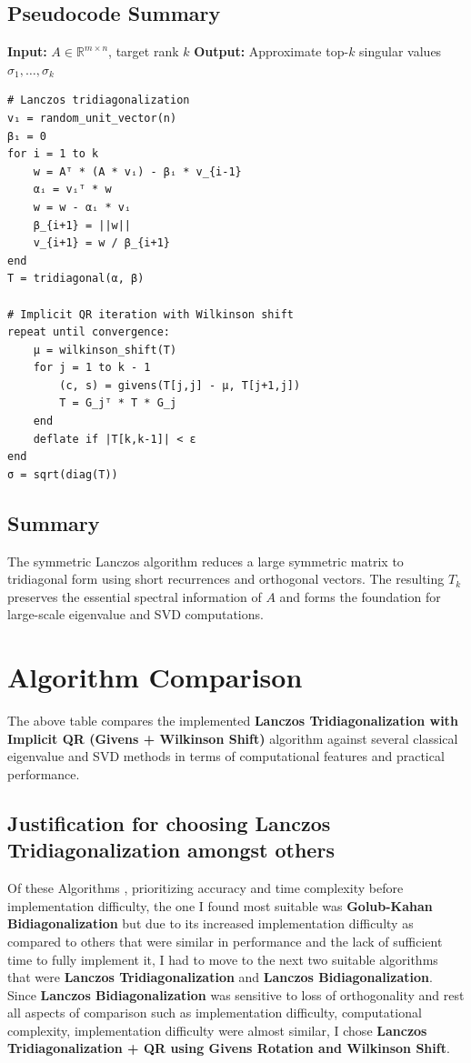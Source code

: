 \documentclass[13pt]{article}
\begin{document}
\subsection{Pseudocode Summary}

\noindent
\textbf{Input:} \( A \in \mathbb{R}^{m \times n} \), target rank \( k \)  
\textbf{Output:} Approximate top-\(k\) singular values \( \sigma_1, \ldots, \sigma_k \)

\begin{verbatim}
# Lanczos tridiagonalization
v₁ = random_unit_vector(n)
β₁ = 0
for i = 1 to k
    w = Aᵀ * (A * vᵢ) - βᵢ * v_{i-1}
    αᵢ = vᵢᵀ * w
    w = w - αᵢ * vᵢ
    β_{i+1} = ||w||
    v_{i+1} = w / β_{i+1}
end
T = tridiagonal(α, β)

# Implicit QR iteration with Wilkinson shift
repeat until convergence:
    μ = wilkinson_shift(T)
    for j = 1 to k - 1
        (c, s) = givens(T[j,j] - μ, T[j+1,j])
        T = G_jᵀ * T * G_j
    end
    deflate if |T[k,k-1]| < ε
end
σ = sqrt(diag(T))
\end{verbatim}

\subsection{Summary}
The symmetric Lanczos algorithm reduces a large symmetric matrix to tridiagonal form using short recurrences and orthogonal vectors. The resulting \(T_k\) preserves the essential spectral information of \(A\) and forms the foundation for large-scale eigenvalue and SVD computations.
\section{Algorithm Comparison}


The above table compares the implemented \textbf{Lanczos Tridiagonalization with Implicit QR (Givens + Wilkinson Shift)} algorithm against several classical eigenvalue and SVD methods in terms of computational features and practical performance.
\subsection{Justification for choosing Lanczos Tridiagonalization amongst others}

Of these Algorithms , prioritizing accuracy and  time complexity before implementation difficulty, the one I found most suitable was \textbf{Golub-Kahan Bidiagonalization} but due to its increased implementation difficulty as compared to others that were similar in performance and the lack of sufficient time to fully implement it, I had to move to the next two suitable algorithms that were \textbf{Lanczos Tridiagonalization} and \textbf{Lanczos Bidiagonalization}. Since \textbf{Lanczos Bidiagonalization} was sensitive to loss of orthogonality and rest all aspects of comparison such as implementation difficulty, computational complexity, implementation difficulty were almost similar, I chose \textbf{Lanczos Tridiagonalization + QR using Givens Rotation and Wilkinson Shift}.
\end{document}
